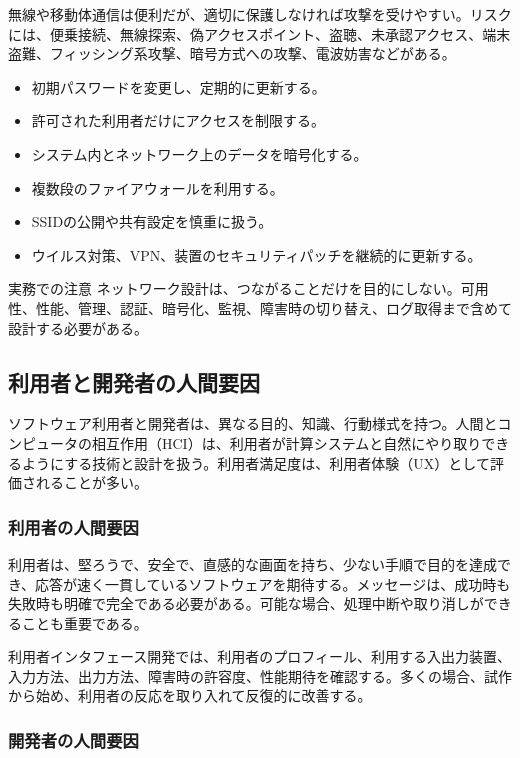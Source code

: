 \documentclass[a4paper,11pt]{ltjsarticle}
\numberwithin{figure}{section}
\numberwithin{table}{section}
\begin{document}
無線や移動体通信は便利だが、適切に保護しなければ攻撃を受けやすい。リスクには、便乗接続、無線探索、偽アクセスポイント、盗聴、未承認アクセス、端末盗難、フィッシング系攻撃、暗号方式への攻撃、電波妨害などがある。

\begin{itemize}[leftmargin=2em]
\item 初期パスワードを変更し、定期的に更新する。
\item 許可された利用者だけにアクセスを制限する。
\item システム内とネットワーク上のデータを暗号化する。
\item 複数段のファイアウォールを利用する。
\item SSIDの公開や共有設定を慎重に扱う。
\item ウイルス対策、VPN、装置のセキュリティパッチを継続的に更新する。
\end{itemize}

\begin{pointbox}{実務での注意}
ネットワーク設計は、つながることだけを目的にしない。可用性、性能、管理、認証、暗号化、監視、障害時の切り替え、ログ取得まで含めて設計する必要がある。

\end{pointbox}

\subsection{利用者と開発者の人間要因}

ソフトウェア利用者と開発者は、異なる目的、知識、行動様式を持つ。人間とコンピュータの相互作用（HCI）は、利用者が計算システムと自然にやり取りできるようにする技術と設計を扱う。利用者満足度は、利用者体験（UX）として評価されることが多い。

\subsubsection{利用者の人間要因}

利用者は、堅ろうで、安全で、直感的な画面を持ち、少ない手順で目的を達成でき、応答が速く一貫しているソフトウェアを期待する。メッセージは、成功時も失敗時も明確で完全である必要がある。可能な場合、処理中断や取り消しができることも重要である。

利用者インタフェース開発では、利用者のプロフィール、利用する入出力装置、入力方法、出力方法、障害時の許容度、性能期待を確認する。多くの場合、試作から始め、利用者の反応を取り入れて反復的に改善する。

\subsubsection{開発者の人間要因}
\end{document}
